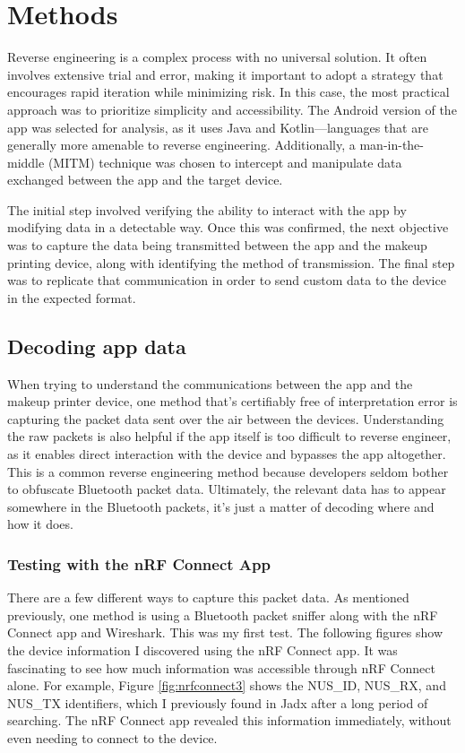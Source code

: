 \chapter{Methods}
Reverse engineering is a complex process with no universal solution. It often involves extensive trial and error, making it important to adopt a strategy that encourages rapid iteration while minimizing risk. In this case, the most practical approach was to prioritize simplicity and accessibility. The Android version of the app was selected for analysis, as it uses Java and Kotlin—languages that are generally more amenable to reverse engineering. Additionally, a man-in-the-middle (MITM) technique was chosen to intercept and manipulate data exchanged between the app and the target device.

The initial step involved verifying the ability to interact with the app by modifying data in a detectable way. Once this was confirmed, the next objective was to capture the data being transmitted between the app and the makeup printing device, along with identifying the method of transmission. The final step was to replicate that communication in order to send custom data to the device in the expected format.

\section{Decoding app data}
When trying to understand the communications between the app and the makeup printer device, one method that’s certifiably free of interpretation error is capturing the packet data sent over the air between the devices. Understanding the raw packets is also helpful if the app itself is too difficult to reverse engineer, as it enables direct interaction with the device and bypasses the app altogether. This is a common reverse engineering method because developers seldom bother to obfuscate Bluetooth packet data. Ultimately, the relevant data has to appear somewhere in the Bluetooth packets, it’s just a matter of decoding where and how it does.

\subsection{Testing with the nRF Connect App}
There are a few different ways to capture this packet data. As mentioned previously, one method is using a Bluetooth packet sniffer along with the nRF Connect app and Wireshark. This was my first test. The following figures show the device information I discovered using the nRF Connect app. It was fascinating to see how much information was accessible through nRF Connect alone. For example, Figure \ref{fig:nrfconnect3} shows the NUS\_ID, NUS\_RX, and NUS\_TX identifiers, which I previously found in Jadx after a long period of searching. The nRF Connect app revealed this information immediately, without even needing to connect to the device.


